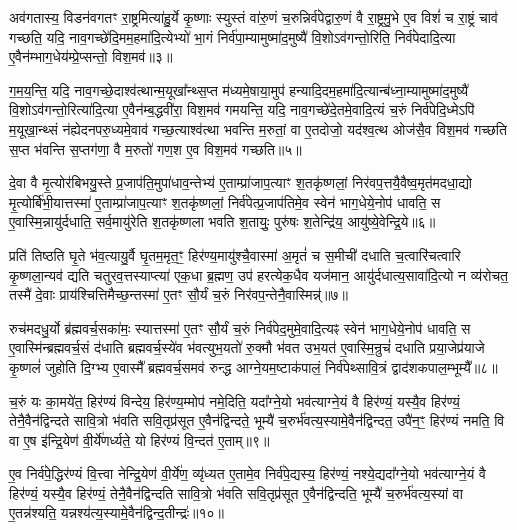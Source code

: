 अव॑गतास्य॒ विडन॑वगतꣳ रा॒ष्ट्रमित्या॑हु॒र्ये कृ॒ष्णाः स्युस्तं वा॑रु॒णं च॒रुन्निर्व॑पेद्वारु॒णं वै रा॒ष्ट्रमु॒भे ए॒व विशं॑ च रा॒ष्ट्रं चाव॑ गच्छति॒ यदि॒ नाव॒गच्छे॑दि॒मम॒हमा॑दि॒त्येभ्यो॑ भा॒गं निर्व॑पा॒म्यामुष्मा॑द॒मुष्यै॑ वि॒शो\-ऽव॑गन्तो॒रिति॒ निर्व॑पेदादि॒त्या ए॒वैन॑म्भाग॒धेय॑म्प्रे॒प्सन्तो॒ विश॒मव॑॥३॥

ग॒म॒य॒न्ति॒ यदि॒ नाव॒गच्छे॒दाश्व॑त्थान्म॒यूखा᳚न्थ्स॒प्त म॑ध्यमे॒षाया॒मुप॑ हन्यादि॒दम॒हमा॑दि॒त्यान्ब॑ध्ना॒म्यामुष्मा॑द॒मुष्यै॑ वि॒शो\-ऽव॑गन्तो॒रित्या॑दि॒त्या ए॒वैन॑म्ब॒द्धवी॑रा॒ विश॒मव॑ गमयन्ति॒ यदि॒ नाव॒गच्छे॑दे॒तमे॒वादि॒त्यं च॒रुं निर्व॑पेदि॒ध्मे\-ऽपि॑ म॒यूखा॒न्थ्सं न॑ह्येदनपरु॒ध्यमे॒वाव॑ गच्छ॒त्याश्व॑त्था भवन्ति म॒रुतां॒ वा ए॒तदोजो॒ यद॑श्व॒त्थ ओज॑सै॒व विश॒मव॑ गच्छति स॒प्त भ॑वन्ति स॒प्तग॑णा॒ वै म॒रुतो॑ गण॒श ए॒व विश॒मव॑ गच्छति॥५॥

{\anuvakamend[{धा॒रय॑द्वतो मरुतो गच्छति॒ विश॒मवै॒तद॒ष्टाद॑श च॥१॥}]}

दे॒वा वै मृ॒त्योर॑बिभयु॒स्ते प्र॒जाप॑ति॒मुपा॑धाव॒न्तेभ्य॑ ए॒ताम्प्रा॑जाप॒त्याꣳ श॒तकृ॑ष्णलां॒ निर॑वप॒त्तयै॒वैष्व॒मृत॑मदधा॒द्यो मृ॒त्योर्बि॑भी॒यात्तस्मा॑ ए॒ताम्प्रा॑जाप॒त्याꣳ श॒तकृ॑ष्णलां॒ निर्व॑पेत्प्र॒जाप॑तिमे॒व स्वेन॑ भाग॒धेये॒नोप॑ धावति॒ स ए॒वास्मि॒न्नायु॑र्दधाति॒ सर्व॒मायु॑रेति श॒तकृ॑ष्णला भवति श॒तायुः॒ पुरु॑षः श॒तेन्द्रि॑य॒ आयु॑ष्ये॒वेन्द्रि॒ये॥६॥

प्रति॑ तिष्ठति घृ॒ते भ॑व॒त्यायु॒र्वै घृ॒तम॒मृत॒ꣳ॒ हिर॑ण्य॒मायु॑श्चै॒वास्मा॑ अ॒मृतं॑ च स॒मीची॑ दधाति च॒त्वारि॑चत्वारि कृ॒ष्णला॒न्यव॑ द्यति चतुरव॒त्तस्याप्त्या॑ एक॒धा ब्र॒ह्मण॒ उप॑ हरत्येक॒धैव यज॑मान॒ आयु॑र्दधात्य॒सावा॑दि॒त्यो न व्य॑रोचत॒ तस्मै॑ दे॒वाः प्राय॑श्चित्तिमैच्छ॒न्तस्मा॑ ए॒तꣳ सौ॒र्यं च॒रुं निर॑वप॒न्तेनै॒वास्मिन्न्॑॥७॥

रुच॑मदधु॒र्यो ब्र॑ह्मवर्च॒सका॑मः॒ स्यात्तस्मा॑ ए॒तꣳ सौ॒र्यं च॒रुं निर्व॑पेद॒मुमे॒वादि॒त्यꣴ स्वेन॑ भाग॒धेये॒नोप॑ धावति॒ स ए॒वास्मि॑न्ब्रह्मवर्च॒सं द॑धाति ब्रह्मवर्च॒स्ये॑व भ॑वत्युभ॒यतो॑ रु॒क्मौ भ॑वत उभ॒यत॑ ए॒वास्मि॒न्रुचं॑ दधाति प्रया॒जेप्र॑याजे कृ॒ष्णलं॑ जुहोति दि॒ग्भ्य ए॒वास्मै᳚ ब्रह्मवर्च॒समव॑ रुन्द्ध आग्ने॒यम॒ष्टाक॑पालं॒ निर्व॑पेथ्सावि॒त्रं द्वाद॑शकपाल॒म्भूम्यै᳚॥८॥

च॒रुं यः का॒मये॑त॒ हिर॑ण्यं विन्देय॒ हिर॑ण्य॒म्मोप॑ नमे॒दिति॒ यदा᳚ग्ने॒यो भव॑त्याग्ने॒यं वै हिर॑ण्यं॒ यस्यै॒व हिर॑ण्यं॒ तेनै॒वैन॑द्विन्दते सावि॒त्रो भ॑वति सवि॒तृप्र॑सूत ए॒वैन॑द्विन्दते॒ भूम्यै॑ च॒रुर्भ॑वत्य॒स्यामे॒वैन॑द्विन्दत॒ उपै॑न॒ꣳ॒ हिर॑ण्यं नमति॒ वि वा ए॒ष इ॑न्द्रि॒येण॑ वी॒र्ये॑णर्ध्यते॒ यो हिर॑ण्यं वि॒न्दत॑ ए॒ताम्॥९॥

ए॒व निर्व॑पे॒द्धिर॑ण्यं वि॒त्त्वा नेन्द्रि॒येण॑ वी॒र्ये॑ण॒ व्यृ॑ध्यत ए॒तामे॒व निर्व॑पे॒द्यस्य॒ हिर॑ण्यं॒ नश्ये॒द्यदा᳚ग्ने॒यो भव॑त्याग्ने॒यं वै हिर॑ण्यं॒ यस्यै॒व हिर॑ण्यं॒ तेनै॒वैन॑द्विन्दति सावि॒त्रो भ॑वति सवि॒तृप्र॑सूत ए॒वैन॑द्विन्दति॒ भूम्यै॑ च॒रुर्भ॑वत्य॒स्यां वा ए॒तन्न॑श्यति॒ यन्नश्य॑त्य॒स्यामे॒वैन॑द्विन्द॒तीन्द्रः॑॥१०॥

